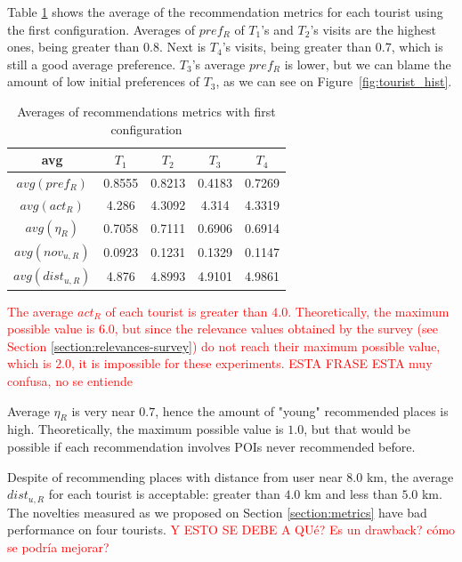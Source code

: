 Table \ref{table:config-1} shows the average of the recommendation metrics for each tourist using the first configuration. Averages of $pref_R$ of $T_1$'s and $T_2$'s visits are the highest ones, being greater than $0.8$.
Next is $T_4$'s visits, being greater than $0.7$, which is still a good average preference. $T_3$'s average $pref_R$ is lower, but we can blame the amount of low initial preferences of $T_3$, as we can see on Figure~\ref{fig:tourist_hist}.

\begin{table}[h!]
    \centering
        \caption{Averages of recommendations metrics with first configuration}
    \label{table:config-1}
    \begin{tabular}{ |c|c|c|c|c| } 
        \hline
        avg & $T_1$ & $T_2$ & $T_3$ & $T_4$ \\
        \hline
        \hline
        $avg(pref_R)$ & 0.8555 & 0.8213 & 0.4183 & 0.7269\\
        $avg(act_R)$ & 4.286 & 4.3092 & 4.314 & 4.3319 \\
        $avg(\eta_R)$ & 0.7058 & 0.7111 & 0.6906 & 0.6914 \\
        $avg(nov_{u,R})$ & 0.0923 & 0.1231 & 0.1329 & 0.1147 \\
        $avg(dist_{u,R})$ & 4.876 & 4.8993 & 4.9101 & 4.9861 \\
       
        \hline
    \end{tabular}
\end{table}

\textcolor{red}{The average $act_R$ of each tourist is greater than $4.0$. Theoretically, the maximum possible value is $6.0$, but since the relevance values obtained by the survey (see Section \ref{section:relevances-survey}) do not reach their maximum possible value, which is $2.0$, it is impossible for these experiments. ESTA FRASE ESTA muy confusa, no se entiende}

Average $\eta_R$ is very near $0.7$, hence the amount of "young" recommended places is high. Theoretically, the maximum possible value is $1.0$, but that would be possible if each recommendation involves POIs never recommended before. 

Despite of recommending places with distance from user near $8.0$ km, the average $dist_{u,R}$ for each tourist is acceptable: greater than $4.0$ km and less than $5.0$ km. The novelties measured as we proposed on Section \ref{section:metrics} have bad performance on four tourists. \textcolor{red}{Y ESTO SE DEBE A QUé? Es un drawback? cómo se podría mejorar?}

